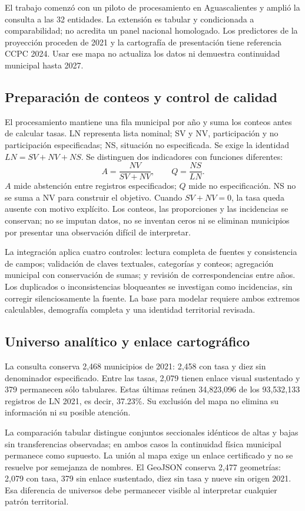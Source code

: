 \documentclass[12pt,a4paper]{article}
\newcommand{\primerparrafo}{\par\noindent\hspace*{1.1em}}
\begin{document}
El trabajo comenzó con un piloto de procesamiento en Aguascalientes y amplió la consulta a las 32 entidades. La extensión es tabular y condicionada a comparabilidad; no acredita un panel nacional homologado. Los predictores de la proyección proceden de 2021 y la cartografía de presentación tiene referencia CCPC 2024. Usar ese mapa no actualiza los datos ni demuestra continuidad municipal hasta 2027.

\clearpage
\subsection{Preparación de conteos y control de calidad}
\primerparrafo
El procesamiento mantiene una fila municipal por año y suma los conteos antes de calcular tasas. LN representa lista nominal; SV y NV, participación y no participación especificadas; NS, situación no especificada. Se exige la identidad $LN=SV+NV+NS$. Se distinguen dos indicadores con funciones diferentes:
\[
 A=\frac{NV}{SV+NV},\qquad Q=\frac{NS}{LN}.
\]
$A$ mide abstención entre registros especificados; $Q$ mide no especificación. NS no se suma a NV para construir el objetivo. Cuando $SV+NV=0$, la tasa queda ausente con motivo explícito. Los conteos, las proporciones y las incidencias se conservan; no se imputan datos, no se inventan ceros ni se eliminan municipios por presentar una observación difícil de interpretar.

La integración aplica cuatro controles: lectura completa de fuentes y consistencia de campos; validación de claves textuales, categorías y conteos; agregación municipal con conservación de sumas; y revisión de correspondencias entre años. Los duplicados o inconsistencias bloqueantes se investigan como incidencias, sin corregir silenciosamente la fuente. La base para modelar requiere ambos extremos calculables, demografía completa y una identidad territorial revisada.

\subsection{Universo analítico y enlace cartográfico}
\primerparrafo
La consulta conserva 2,468 municipios de 2021: 2,458 con tasa y diez sin denominador especificado. Entre las tasas, 2,079 tienen enlace visual sustentado y 379 permanecen sólo tabulares. Estas últimas reúnen 34,823,096 de los 93,532,133 registros de LN 2021, es decir, 37.23\%. Su exclusión del mapa no elimina su información ni su posible atención.

La comparación tabular distingue conjuntos seccionales idénticos de altas y bajas sin transferencias observadas; en ambos casos la continuidad física municipal permanece como supuesto. La unión al mapa exige un enlace certificado y no se resuelve por semejanza de nombres. El GeoJSON conserva 2,477 geometrías: 2,079 con tasa, 379 sin enlace sustentado, diez sin tasa y nueve sin origen 2021. Esa diferencia de universos debe permanecer visible al interpretar cualquier patrón territorial.
\end{document}
